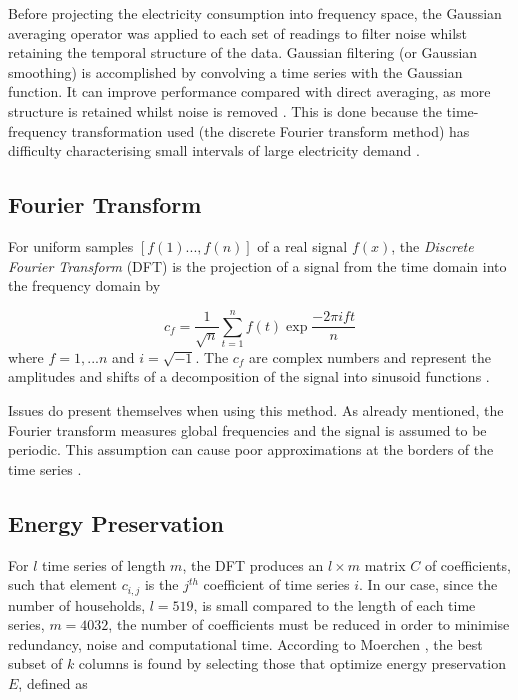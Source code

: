 Before projecting the electricity consumption into frequency space, the Gaussian averaging operator was applied to each set of readings to filter noise whilst retaining the temporal structure of the data. Gaussian filtering (or Gaussian smoothing) is accomplished by convolving a time series with the Gaussian function. It can improve performance compared with direct averaging, as more structure is retained whilst noise is removed \cite{Nixon}. This is done because the time-frequency transformation used (the discrete Fourier transform method) has difficulty characterising small intervals of large electricity demand \cite{Graps}.



\householdConv %



\subsection*{Fourier Transform}

For uniform samples $[f(1)...,f(n)]$ of a real signal $f(x)$, the \textit{Discrete Fourier Transform} (DFT) is the projection of a signal from the time domain into the frequency domain by

\[c_f=\frac{1}{\sqrt{n}}\sum_{t=1}^nf(t)\exp{\frac{-2\pi ift}{n}}\]
where $f=1,...n$ and $i=\sqrt{-1}$. The $c_f$ are complex numbers and represent
the amplitudes and shifts of a decomposition of the signal into sinusoid functions \cite{Moerchen}.


Issues do present themselves when using this method. As already mentioned, the Fourier transform measures global frequencies and the signal is assumed to be periodic. This assumption can cause poor approximations at the borders of the time series \cite{Moerchen}.

\subsection*{Energy Preservation}

For $l$ time series of length $m$, the DFT produces an $l \times m$ matrix $C $ of coefficients, such that element $c_{i,j}$ is the $j^{th}$ coefficient of time series $i$. In our case, since the number of households, $l=519$, is small compared to the length of each time series, $m=4032$, the number of coefficients must be reduced in order to minimise redundancy, noise and computational time. According to Moerchen \cite{Moerchen}, the best subset of $k$ columns is found by selecting those that optimize energy preservation $E$, defined as

